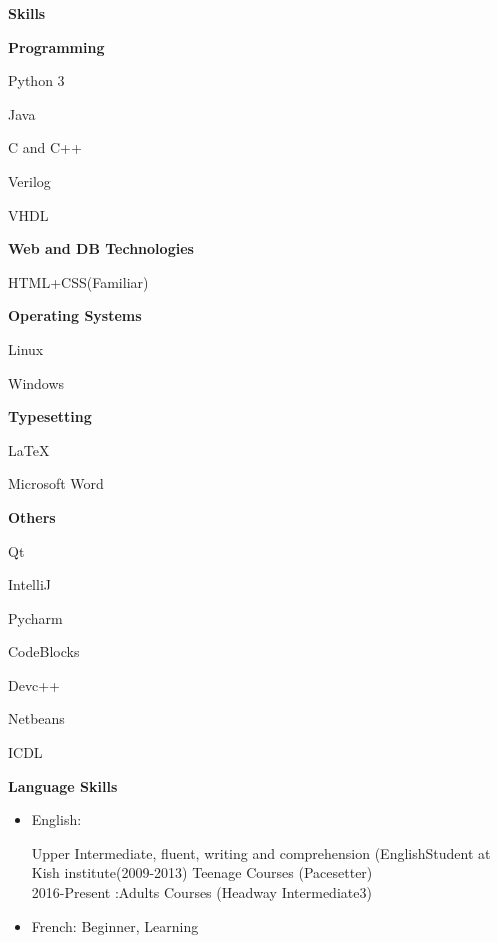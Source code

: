 \documentclass[a4paper,12pt,final]{memoir}
\newcommand{\SmallSep}{\vspace{0.5em}}
\newcommand{\CVSection}[1]
	{\Large\textbf{#1}\par
	\SmallSep\normalsize\normalfont}
\newcommand{\CVItem}[1]
	{\textbf{\color{RoyalBlue} #1}}
\begin{document}
\CVSection{Skills}
\CVItem{Programming}
\begin{multicols}{3}
\begin{compactitem}[\color{RoyalBlue}$\circ$]
	\item Python 3
	\item Java
	\item C and C++
	\item Verilog
	\item VHDL
	
\end{compactitem}
\end{multicols}
\SmallSep
\CVItem{Web and DB Technologies}
\begin{multicols}{3}
\begin{compactitem}[\color{RoyalBlue}$\circ$]
	\item HTML+CSS(Familiar)
\end{compactitem}
\end{multicols}
\SmallSep
\CVItem{Operating Systems}
\begin{multicols}{3}
\begin{compactitem}[\color{RoyalBlue}$\circ$]
	\item Linux
	\item Windows
\end{compactitem}
\end{multicols}
\SmallSep
\CVItem{Typesetting}
\begin{multicols}{3}
\begin{compactitem}[\color{RoyalBlue}$\circ$]
	\item LaTeX
	\item Microsoft Word
\end{compactitem}
\end{multicols}
\SmallSep
\CVItem{Others}
\begin{multicols}{3}
\begin{compactitem}[\color{RoyalBlue}$\circ$]
	\item Qt
	\item IntelliJ
	\item Pycharm
    	\item  CodeBlocks
    		\item Devc++
    			\item Netbeans
    			\item ICDL
    		
    			
\end{compactitem}
\end{multicols}


\SmallSep
\CVItem{Language Skills}
	\begin{itemize}[$\circ$]

\item English: 

Upper Intermediate, fluent, writing and comprehension
(EnglishStudent at Kish institute(2009-2013) Teenage Courses (Pacesetter)  \\
2016-Present :Adults Courses (Headway Intermediate3)
\item French: Beginner, Learning
	\end{itemize}
\end{document}
